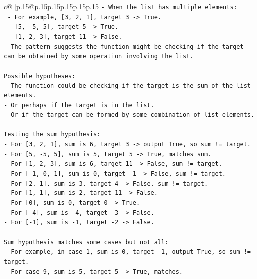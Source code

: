 \documentclass{article}
\begin{document}
{\begin{supertabular}{c@{$\;$}|p{.15\linewidth}@{}p{.15\linewidth}p{.15\linewidth}p{.15\linewidth}p{.15\linewidth}p{.15\linewidth}}
{{{\texttt{{-} When the list has multiple elements:} \\
\texttt{  {-} For example, {[}3, 2, 1{]}, target 3 {-}> True.} \\
\texttt{  {-} {[}5, {-}5, 5{]}, target 5 {-}> True.} \\
\texttt{  {-} {[}1, 2, 3{]}, target 11 {-}> False.} \\
\texttt{{-} The pattern suggests the function might be checking if the target can be obtained by some operation involving the list.} \\
\\ 
\texttt{Possible hypotheses:} \\
\texttt{{-} The function could be checking if the target is the sum of the list elements.} \\
\texttt{{-} Or perhaps if the target is in the list.} \\
\texttt{{-} Or if the target can be formed by some combination of list elements.} \\
\\ 
\texttt{Testing the sum hypothesis:} \\
\texttt{{-} For {[}3, 2, 1{]}, sum is 6, target 3 {-}> output True, so sum != target.} \\
\texttt{{-} For {[}5, {-}5, 5{]}, sum is 5, target 5 {-}> True, matches sum.} \\
\texttt{{-} For {[}1, 2, 3{]}, sum is 6, target 11 {-}> False, sum != target.} \\
\texttt{{-} For {[}{-}1, 0, 1{]}, sum is 0, target {-}1 {-}> False, sum != target.} \\
\texttt{{-} For {[}2, 1{]}, sum is 3, target 4 {-}> False, sum != target.} \\
\texttt{{-} For {[}1, 1{]}, sum is 2, target 11 {-}> False.} \\
\texttt{{-} For {[}0{]}, sum is 0, target 0 {-}> True.} \\
\texttt{{-} For {[}{-}4{]}, sum is {-}4, target {-}3 {-}> False.} \\
\texttt{{-} For {[}{-}1{]}, sum is {-}1, target {-}2 {-}> False.} \\
\\ 
\texttt{Sum hypothesis matches some cases but not all:} \\
\texttt{{-} For example, in case 1, sum is 0, target {-}1, output True, so sum != target.} \\
\texttt{{-} For case 9, sum is 5, target 5 {-}> True, matches.} \\
\\ 
}}}
\end{supertabular}}
\end{document}
